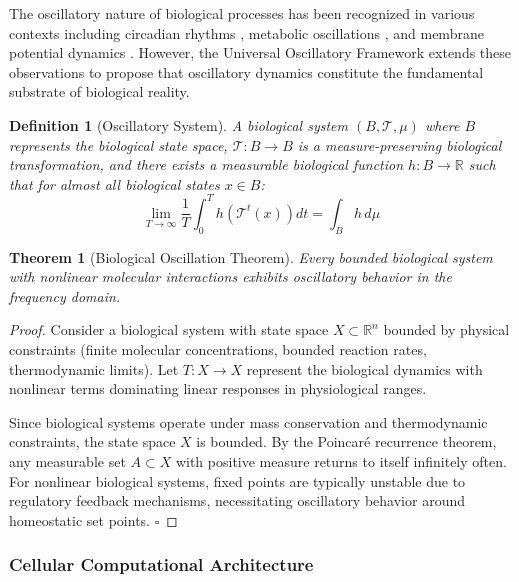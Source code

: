 \documentclass[12pt,a4paper]{article}
\newtheorem{theorem}{Theorem}
\newtheorem{definition}{Definition}
\begin{document}
The oscillatory nature of biological processes has been recognized in various contexts including circadian rhythms \cite{dunlap1999molecular}, metabolic oscillations \cite{goldbeter1996biochemical}, and membrane potential dynamics \cite{hodgkin1952quantitative}. However, the Universal Oscillatory Framework extends these observations to propose that oscillatory dynamics constitute the fundamental substrate of biological reality.

\begin{definition}[Oscillatory System]
A biological system $(B, \mathcal{T}, \mu)$ where $B$ represents the biological state space, $\mathcal{T}: B \to B$ is a measure-preserving biological transformation, and there exists a measurable biological function $h: B \to \mathbb{R}$ such that for almost all biological states $x \in B$:
\begin{equation}
\lim_{T \to \infty} \frac{1}{T}\int_0^T h(\mathcal{T}^t(x)) dt = \int_B h \, d\mu
\end{equation}
\end{definition}

\begin{theorem}[Biological Oscillation Theorem]
Every bounded biological system with nonlinear molecular interactions exhibits oscillatory behavior in the frequency domain.
\end{theorem}

\begin{proof}
Consider a biological system with state space $X \subset \mathbb{R}^n$ bounded by physical constraints (finite molecular concentrations, bounded reaction rates, thermodynamic limits). Let $T: X \to X$ represent the biological dynamics with nonlinear terms dominating linear responses in physiological ranges.

Since biological systems operate under mass conservation and thermodynamic constraints, the state space $X$ is bounded. By the Poincar\'{e} recurrence theorem, any measurable set $A \subset X$ with positive measure returns to itself infinitely often. For nonlinear biological systems, fixed points are typically unstable due to regulatory feedback mechanisms, necessitating oscillatory behavior around homeostatic set points. $\square$
\end{proof}

\subsubsection{Cellular Computational Architecture}
\end{document}
